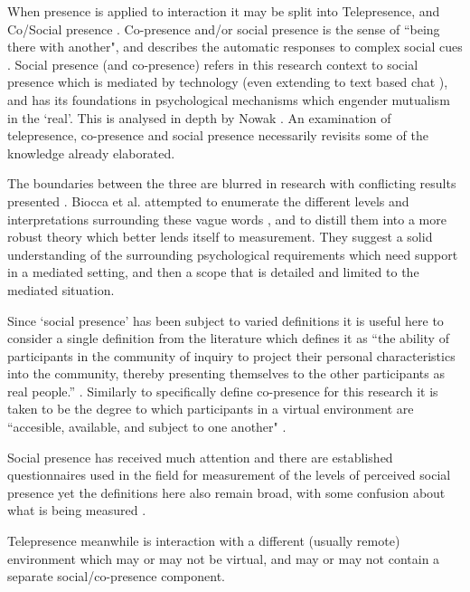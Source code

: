 When presence is applied to interaction it may be split into Telepresence, and Co/Social presence  \cite{heeter1992being, Biocca1997}.  Co-presence and/or social presence is the sense of ``being there with another", and describes the automatic responses to complex social cues \cite{doi:10.1080/01449299508914633, fulk1987social, haythornthwaite1995work}.    Social presence (and co-presence) refers in this research context to social presence which is mediated by technology (even extending to text based chat \cite{Gunawardena1997}), and has its foundations in psychological mechanisms which engender mutualism in the `real'. This is analysed in depth by Nowak \cite{Nowak2001}. An examination of telepresence, co-presence and social presence necessarily revisits some of the knowledge already elaborated.\par
        The boundaries between the three are blurred in research with conflicting results presented \cite{Bulu2012}. Biocca et al. attempted to enumerate the different levels and interpretations surrounding these vague words \cite{Biocca2003}, and to distill them into a more robust theory which better lends itself to measurement. They suggest a solid understanding of the surrounding psychological requirements which need support in a mediated setting, and then a scope that is detailed and limited to the mediated situation.\par
 Since `social presence' has been subject to varied definitions \cite{Biocca2003} it is useful here to consider a single definition from the literature which defines it as ``the ability of participants in the community of inquiry to project their personal characteristics into the community, thereby presenting themselves to the other participants as real people.'' \cite{Garrison1999, Beck2011}. Similarly to specifically define co-presence for this research it is taken to be the degree to which participants in a virtual environment are ``accesible, available, and subject to one another" \cite{Biocca2003}. \par
            Social presence has received much attention and there are established questionnaires used in the field for measurement of the levels of perceived social presence yet the definitions here also remain broad, with some confusion about what is being measured \cite{Biocca2003a}.\par            
 Telepresence meanwhile is interaction with a different (usually remote) environment which may or may not be virtual, and may or may not contain a separate social/co-presence component. \par 
